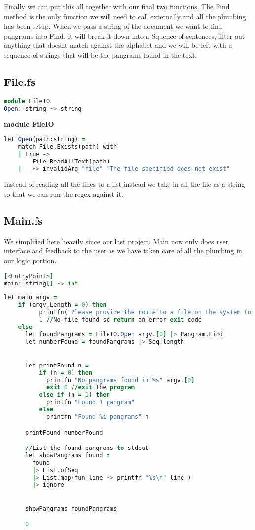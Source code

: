 Finally we can put this all together with our final two functions. The Find method is the only function we will need to call externally and all the plumbing
has been setup. When we pass a string of the document we want to find pangrams into Find, it will break it down into a Squence of sentences, filter out anything that doesnt match
against the alphabet and we will be left with a sequence of strings that will be the pangrams found in the text.


\subsection{File.fs}

\begin{lstlisting}[language=F]
module FileIO
Open: string -> string
\end{lstlisting}

\bigskip
\textbf{module FileIO}
\begin{lstlisting}[language=F]
let Open(path:string) =
    match File.Exists(path) with
    | true ->
        File.ReadAllText(path)
    | _ -> invalidArg "file" "The file specified does not exist"
\end{lstlisting}

Instead of reading all the lines to a list instead we take in all the file as a string so that we can run the regex against it.

\subsection{Main.fs}

We simplified here heavily since our last project. Main now only does user interface and feedback to the user as we have taken care of all the
plumbing in our logic portion.

\begin{lstlisting}[language=F]
[<EntryPoint>]
main: string[] -> int
\end{lstlisting}


\begin{lstlisting}[language=F]
let main argv =
    if (argv.Length = 0) then
          printfn("Please provide the route to a file on the system to process")
          1 //No file found so return an error exit code
    else
      let foundPangrams = FileIO.Open argv.[0] |> Pangram.Find
      let numberFound = foundPangrams |> Seq.length


      let printFound n =
          if (n = 0) then
            printfn "No pangrams found in %s" argv.[0]
            exit 0 //exit the program
          else if (n = 1) then
            printfn "Found 1 pangram"
          else
            printfn "Found %i pangrams" n

      printFound numberFound

      //List the found pangrams to stdout
      let showPangrams found =
        found
        |> List.ofSeq
        |> List.map(fun line -> printfn "%s\n" line )
        |> ignore


      showPangrams foundPangrams

      0
\end{lstlisting}

